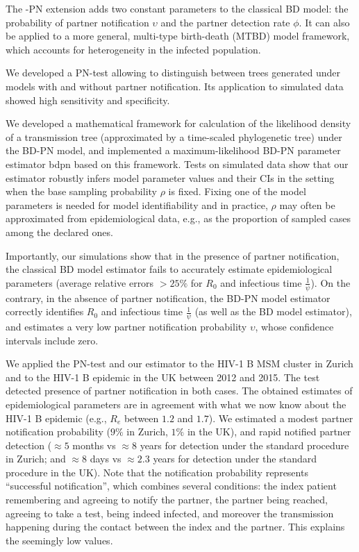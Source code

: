 \documentclass[10pt,letterpaper]{article}
\begin{document}
The -PN extension adds two constant parameters to the classical BD model: the probability of partner notification $\upsilon$ and the partner detection rate $\phi$. It can also be applied to a more general, multi-type birth-death (MTBD) model framework, which accounts for heterogeneity in the infected population. 

We developed a PN-test allowing to distinguish between trees generated under models with and without partner notification. Its application to simulated data showed high sensitivity and specificity. 

We developed a mathematical framework for calculation of the likelihood density of a transmission tree (approximated by a time-scaled phylogenetic tree) under the BD-PN model, and implemented a maximum-likelihood BD-PN parameter estimator bdpn based on this framework. %
Tests on simulated data show that our estimator robustly infers model parameter values and their CIs in the setting when %
the base sampling probability $\rho$ is fixed. Fixing one of the model parameters is needed for model identifiability and in practice, $\rho$ may often be approximated from epidemiological data, e.g., as the proportion of sampled cases among the declared ones. 

Importantly, our simulations show that in the presence of partner notification, the classical BD model estimator fails to accurately estimate epidemiological parameters (average relative errors $> 25\%$ for $R_0$ and infectious time $\frac{1}{\psi}$). On the contrary, in the absence of partner notification, the BD-PN model estimator correctly identifies $R_0$ and infectious time $\frac{1}{\psi}$ (as well as the BD model estimator), and estimates a very low partner notification probability $\upsilon$, whose confidence intervals include zero.

We applied the PN-test and our estimator to the HIV-1 B MSM cluster in Zurich and to the HIV-1 B epidemic in the UK between 2012 and 2015. The test detected presence of partner notification in both cases. The obtained estimates of epidemiological parameters are in agreement with what we now know about the HIV-1 B epidemic (e.g., $R_e$ between $1.2$ and $1.7$). We estimated a modest partner notification probability ($9\%$ in Zurich, $1\%$ in the UK), and rapid notified partner detection ($\approx 5$ months vs $\approx  8$ years for detection under the standard procedure in Zurich; and $\approx 8$ days vs $\approx 2.3$ years for detection under the standard procedure in the UK). Note that the notification probability represents ``successful notification'', which combines several conditions: the index patient remembering and agreeing to notify the partner, the partner being reached, agreeing to take a test, being indeed infected, and moreover the transmission happening during the contact between the index and the partner. This explains the seemingly low values.
\end{document}
